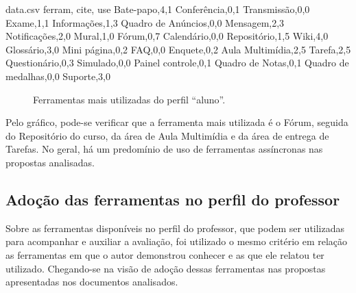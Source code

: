 \begin{filecontents}{data.csv}
ferram,	cite,	use
Bate-papo,4,1
Conferência,0,1
Transmissão,0,0
Exame,1,1
Informações,1,3
Quadro de Anúncios,0,0
Mensagem,2,3
Notificações,2,0
Mural,1,0
Fórum,0,7
Calendário,0,0
Repositório,1,5
Wiki,4,0
Glossário,3,0
Mini página,0,2
FAQ,0,0
Enquete,0,2
Aula Multimídia,2,5
Tarefa,2,5
Questionário,0,3
Simulado,0,0
Painel controle,0,1
Quadro de Notas,0,1
Quadro de medalhas,0,0
Suporte,3,0
\end{filecontents}
\datatable

\begin{figure}[ht!]
    \centering
    \label{fig:ferram_maisutil}
    \caption{Ferramentas mais utilizadas do perfil ``aluno''.}
    \vspace{2mm}
    \vspace{2mm}
\end{figure}

Pelo gráfico, pode-se verificar que a ferramenta mais utilizada é o Fórum, seguida do Repositório do curso, da área de Aula Multimídia e da área de entrega de Tarefas. No geral, há um predomínio de uso de ferramentas assíncronas nas propostas analisadas.


\subsection{Adoção das ferramentas no perfil do professor}%
Sobre as ferramentas disponíveis no perfil do professor, que podem ser utilizadas para acompanhar e auxiliar a avaliação, foi utilizado o mesmo critério em relação as ferramentas em que o autor demonstrou conhecer e as que ele relatou ter utilizado. Chegando-se na visão de adoção dessas ferramentas nas propostas apresentadas nos documentos analisados. 

